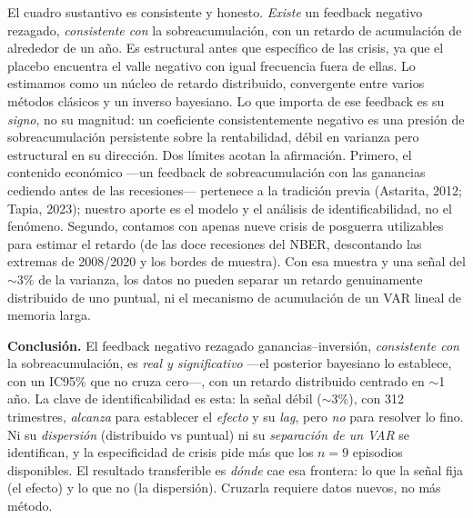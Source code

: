 \documentclass[11pt]{article}
\begin{document}
El cuadro sustantivo es consistente y honesto. \emph{Existe} un feedback negativo rezagado, \emph{consistente con} la sobreacumulación, con un
retardo de acumulación de alrededor de un año. Es estructural antes que específico de las crisis, ya
que el placebo encuentra el valle negativo con igual frecuencia fuera de ellas. Lo estimamos como un
núcleo de retardo distribuido, convergente entre varios métodos clásicos y un inverso bayesiano. Lo que importa de ese feedback es su \emph{signo}, no su magnitud: un coeficiente consistentemente negativo es una presión de sobreacumulación persistente sobre la rentabilidad, débil en varianza pero estructural en su dirección. Dos
límites acotan la afirmación. Primero, el contenido económico ---un feedback de sobreacumulación con
las ganancias cediendo antes de las recesiones--- pertenece a la tradición previa (Astarita, 2012;
Tapia, 2023); nuestro aporte es el modelo y el análisis de identificabilidad, no el fenómeno.
Segundo, contamos con apenas nueve crisis de posguerra utilizables para estimar el retardo (de las
doce recesiones del NBER, descontando las extremas de 2008/2020 y los bordes de muestra). Con esa
muestra y una señal del $\sim$3\% de la varianza, los datos no pueden separar un retardo genuinamente
distribuido de uno puntual, ni el mecanismo de acumulación de un VAR lineal de memoria larga.

\textbf{Conclusión.} El feedback negativo rezagado ganancias--inversión, \emph{consistente con} la
sobreacumulación, es \emph{real y significativo} ---el posterior bayesiano lo establece, con un IC95\% que no cruza cero---, con un
retardo distribuido centrado en $\sim$1 año. La clave de identificabilidad es esta: la señal débil
($\sim$3\%), con 312 trimestres, \emph{alcanza} para establecer el \emph{efecto} y su \emph{lag},
pero \emph{no} para resolver lo fino. Ni su \emph{dispersión} (distribuido vs puntual) ni su
\emph{separación de un VAR} se identifican, y la especificidad de crisis pide más que los $n=9$
episodios disponibles. El resultado transferible es \emph{dónde} cae esa frontera: lo que la señal
fija (el efecto) y lo que no (la dispersión). Cruzarla requiere datos nuevos, no más método.
\end{document}
